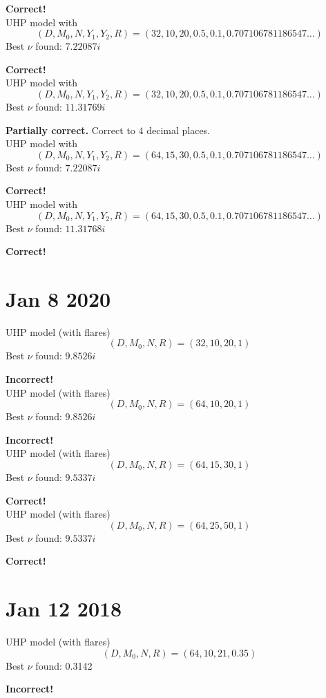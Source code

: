 \documentclass[]{article}
\begin{document}
\textbf{Correct!}
\\

UHP model with
$$
(D, M_0, N, Y_1, Y_2, R) =
( 32,10,20,0.5,0.1,0.707106781186547\dots)
$$
Best $\nu$ found: $7.22087i$

\textbf{Correct!}
\\

UHP model with
$$
(D, M_0, N, Y_1, Y_2, R) =
( 32,10,20,0.5,0.1,0.707106781186547\dots)
$$
Best $\nu$ found: $11.31769i$

\textbf{Partially correct.} Correct to $4$ decimal places.
\\

UHP model with
$$
(D, M_0, N, Y_1, Y_2, R) =
( 64,15,30,0.5,0.1,0.707106781186547\dots)
$$
Best $\nu$ found: $7.22087i$

\textbf{Correct!}
\\

UHP model with
$$
(D, M_0, N, Y_1, Y_2, R) =
( 64,15,30,0.5,0.1,0.707106781186547\dots)
$$
Best $\nu$ found: $11.31768i$

\textbf{Correct!}

\section*{Jan 8 2020}

UHP model (with flares)
$$
(D, M_0, N, R) =
( 32,10,20,1 )
$$
Best $\nu$ found: $9.8526i$

\textbf{Incorrect!}
\\

UHP model (with flares)
$$
(D, M_0, N, R) =
( 64,10,20,1 )
$$
Best $\nu$ found: $9.8526i$

\textbf{Incorrect!}
\\

UHP model (with flares)
$$
(D, M_0, N, R) =
( 64,15,30,1 )
$$
Best $\nu$ found: $9.5337i$

\textbf{Correct!}
\\

UHP model (with flares)
$$
(D, M_0, N, R) =
( 64,25,50,1 )
$$
Best $\nu$ found: $9.5337i$

\textbf{Correct!}

\section*{Jan 12 2018}

UHP model (with flares)
$$
(D, M_0, N, R) =
( 64,10,21,0.35 )
$$
Best $\nu$ found: 0.3142

\textbf{Incorrect!}
	
\end{document}
